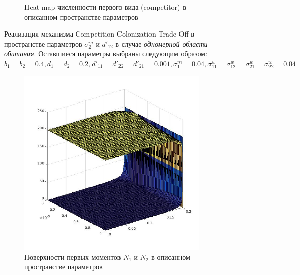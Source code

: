 \begin{figure}
\begin{subfigure}{.5\textwidth}
		\caption{Heat map численности первого вида (competitor) в описанном пространстве параметров} 
		\label{fig:cctod1:sub4}
	\end{subfigure}
	\caption{Реализация механизма Competition-Colonization Trade-Off  в пространстве параметров  $\sigma^m_2$ и $d'_{12}$ в случае  \emph{одномерной области обитания}. Оставшиеся параметры выбраны следующим образом:  $b_{1}=b_{2}=0.4
		, d_{1}=d_{2}=0.2
		, d'_{11}=d'_{22}=d'_{21}=0.001,
		\sigma_{1}^{m}=0.04
		, \sigma_{11}^{w}=\sigma_{12}^{w}=\sigma_{21}^{w}=\sigma_{22}^{w}=0.04$}
	\label{fig:cctod1}
\end{figure}

\begin{figure}
	\centering
	\begin{subfigure}{.5\textwidth}
		\centering
		\includegraphics[width=.95\linewidth]{N1N2cctoD2.jpg}
		\caption{Поверхности первых моментов \(N_1\) и \(N_2\) в описанном пространстве параметров}
		\label{fig:cctod2:sub1}
	\end{subfigure}%
	\begin{subfigure}{.5\textwidth}
		\centering

\end{subfigure}
\end{figure}
